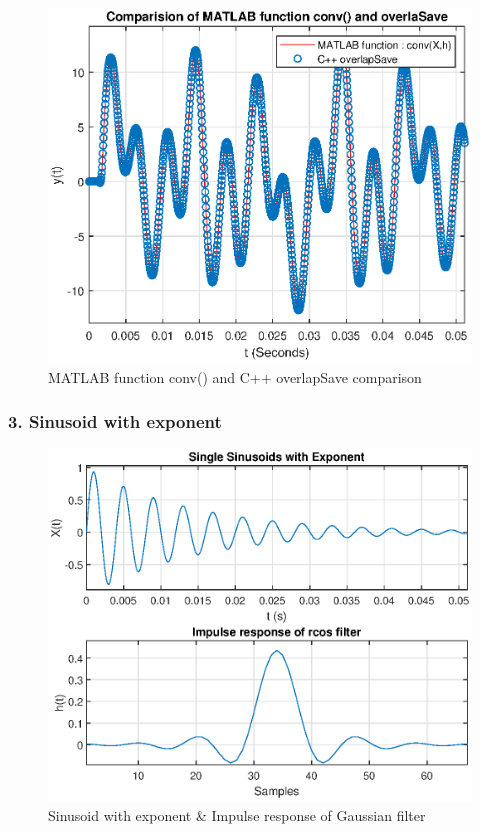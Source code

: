 \begin{refsection}
\begin{figure}[h]
	\centering
	\includegraphics[width=12.5cm]{./algorithms/overlap_save/figures/mixed_signal2_conv_and_C++.eps}
	\caption{MATLAB function conv() and C++ overlapSave comparison}\label{mixed_signal2_conv_and_C++}
\end{figure}

\newpage

\subsubsection{3. Sinusoid with exponent}
\begin{figure}[h]
	\centering
	\includegraphics[width=12cm]{./algorithms/overlap_save/figures/sinusoid_with_exponent.eps}
	\caption{Sinusoid with exponent \& Impulse response of Gaussian filter}\label{sinusoid_with_exponent}
\end{figure}


\end{refsection}
